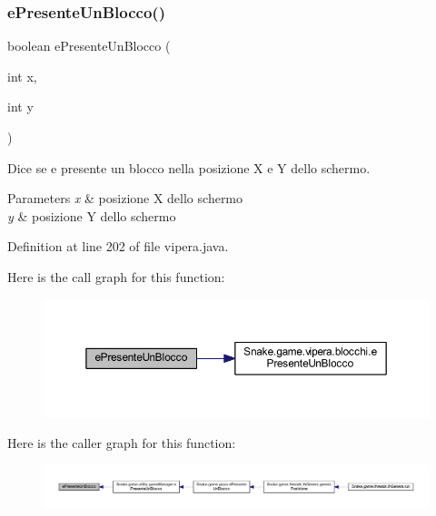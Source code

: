 \subsubsection{\texorpdfstring{e\+Presente\+Un\+Blocco()}{ePresenteUnBlocco()}}
{\footnotesize\ttfamily boolean e\+Presente\+Un\+Blocco (\begin{DoxyParamCaption}\item[{int}]{x,  }\item[{int}]{y }\end{DoxyParamCaption})}



Dice se e\textquotesingle{} presente un blocco nella posizione X e Y dello schermo. 


\begin{DoxyParams}{Parameters}
{\em x} & posizione X dello schermo \\
\hline
{\em y} & posizione Y dello schermo \\
\hline
\end{DoxyParams}


Definition at line 202 of file vipera.\+java.

Here is the call graph for this function\+:
\nopagebreak
\begin{figure}[H]
\begin{center}
\leavevmode
\includegraphics[width=350pt]{class_snake_1_1game_1_1vipera_1_1vipera_ac24833a417b3bd7c60e29ed5b7edc29f_cgraph}
\end{center}
\end{figure}
Here is the caller graph for this function\+:
\nopagebreak
\begin{figure}[H]
\begin{center}
\leavevmode
\includegraphics[width=350pt]{class_snake_1_1game_1_1vipera_1_1vipera_ac24833a417b3bd7c60e29ed5b7edc29f_icgraph}
\end{center}
\end{figure}
\mbox{\label{class_snake_1_1game_1_1vipera_1_1vipera_a6c5d6f8c561308ff9ec579b370a969e0}} 
